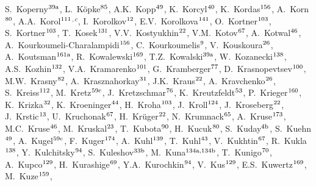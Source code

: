 \begin{flushleft}
S.~Koperny$^\textrm{\scriptsize 39a}$,
L.~K\"opke$^\textrm{\scriptsize 85}$,
A.K.~Kopp$^\textrm{\scriptsize 49}$,
K.~Korcyl$^\textrm{\scriptsize 40}$,
K.~Kordas$^\textrm{\scriptsize 156}$,
A.~Korn$^\textrm{\scriptsize 80}$,
A.A.~Korol$^\textrm{\scriptsize 111}$$^{,c}$,
I.~Korolkov$^\textrm{\scriptsize 12}$,
E.V.~Korolkova$^\textrm{\scriptsize 141}$,
O.~Kortner$^\textrm{\scriptsize 103}$,
S.~Kortner$^\textrm{\scriptsize 103}$,
T.~Kosek$^\textrm{\scriptsize 131}$,
V.V.~Kostyukhin$^\textrm{\scriptsize 22}$,
V.M.~Kotov$^\textrm{\scriptsize 67}$,
A.~Kotwal$^\textrm{\scriptsize 46}$,
A.~Kourkoumeli-Charalampidi$^\textrm{\scriptsize 156}$,
C.~Kourkoumelis$^\textrm{\scriptsize 9}$,
V.~Kouskoura$^\textrm{\scriptsize 26}$,
A.~Koutsman$^\textrm{\scriptsize 161a}$,
R.~Kowalewski$^\textrm{\scriptsize 169}$,
T.Z.~Kowalski$^\textrm{\scriptsize 39a}$,
W.~Kozanecki$^\textrm{\scriptsize 138}$,
A.S.~Kozhin$^\textrm{\scriptsize 132}$,
V.A.~Kramarenko$^\textrm{\scriptsize 101}$,
G.~Kramberger$^\textrm{\scriptsize 77}$,
D.~Krasnopevtsev$^\textrm{\scriptsize 100}$,
M.W.~Krasny$^\textrm{\scriptsize 82}$,
A.~Krasznahorkay$^\textrm{\scriptsize 31}$,
J.K.~Kraus$^\textrm{\scriptsize 22}$,
A.~Kravchenko$^\textrm{\scriptsize 26}$,
S.~Kreiss$^\textrm{\scriptsize 112}$,
M.~Kretz$^\textrm{\scriptsize 59c}$,
J.~Kretzschmar$^\textrm{\scriptsize 76}$,
K.~Kreutzfeldt$^\textrm{\scriptsize 53}$,
P.~Krieger$^\textrm{\scriptsize 160}$,
K.~Krizka$^\textrm{\scriptsize 32}$,
K.~Kroeninger$^\textrm{\scriptsize 44}$,
H.~Kroha$^\textrm{\scriptsize 103}$,
J.~Kroll$^\textrm{\scriptsize 124}$,
J.~Kroseberg$^\textrm{\scriptsize 22}$,
J.~Krstic$^\textrm{\scriptsize 13}$,
U.~Kruchonak$^\textrm{\scriptsize 67}$,
H.~Kr\"uger$^\textrm{\scriptsize 22}$,
N.~Krumnack$^\textrm{\scriptsize 65}$,
A.~Kruse$^\textrm{\scriptsize 173}$,
M.C.~Kruse$^\textrm{\scriptsize 46}$,
M.~Kruskal$^\textrm{\scriptsize 23}$,
T.~Kubota$^\textrm{\scriptsize 90}$,
H.~Kucuk$^\textrm{\scriptsize 80}$,
S.~Kuday$^\textrm{\scriptsize 4b}$,
S.~Kuehn$^\textrm{\scriptsize 49}$,
A.~Kugel$^\textrm{\scriptsize 59c}$,
F.~Kuger$^\textrm{\scriptsize 174}$,
A.~Kuhl$^\textrm{\scriptsize 139}$,
T.~Kuhl$^\textrm{\scriptsize 43}$,
V.~Kukhtin$^\textrm{\scriptsize 67}$,
R.~Kukla$^\textrm{\scriptsize 138}$,
Y.~Kulchitsky$^\textrm{\scriptsize 94}$,
S.~Kuleshov$^\textrm{\scriptsize 33b}$,
M.~Kuna$^\textrm{\scriptsize 134a,134b}$,
T.~Kunigo$^\textrm{\scriptsize 70}$,
A.~Kupco$^\textrm{\scriptsize 129}$,
H.~Kurashige$^\textrm{\scriptsize 69}$,
Y.A.~Kurochkin$^\textrm{\scriptsize 94}$,
V.~Kus$^\textrm{\scriptsize 129}$,
E.S.~Kuwertz$^\textrm{\scriptsize 169}$,
M.~Kuze$^\textrm{\scriptsize 159}$,
$$
\end{flushleft}
